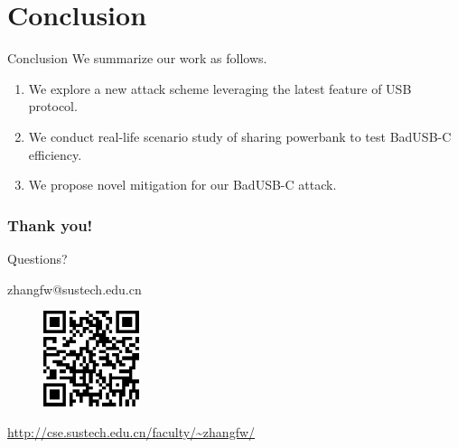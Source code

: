 \documentclass{beamer}
\begin{document}
\section{Conclusion}
\begin{frame}{Conclusion}
	We summarize our work as follows.
	\begin{enumerate}
		\item We explore a new attack scheme leveraging the latest feature of USB protocol.
		\item We conduct real-life scenario study of sharing powerbank to test BadUSB-C efficiency.
		\item We propose novel mitigation for our BadUSB-C attack.
	\end{enumerate}
\end{frame}


\begin{frame}
\frametitle{Thank you!}
\begin{center}
{\huge Questions?}
\vspace{10pt}

zhangfw@sustech.edu.cn
\vspace{10pt}


\begin{figure}
\includegraphics[width=0.25\textwidth]{homepageqrcode.png}
\end{figure}

\vspace{-10pt}
\url{http://cse.sustech.edu.cn/faculty/~zhangfw/}

\end{center}

\end{frame}


\begin{frame}[allowframebreaks]
	
	
\end{frame}
\end{document}
